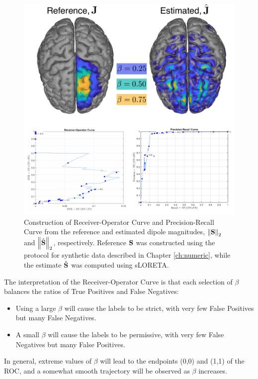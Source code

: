 \begin{figure}
\centering
\includegraphics[width=\linewidth]{./img_dev/AUROC_sketch.pdf}
%
\caption{Construction of Receiver-Operator Curve and Precision-Recall Curve from the reference and estimated dipole magnitudes, $\left\lVert {\mathbf{S}} \right\rVert_2$ and $\left\lVert \hat{\mathbf{S}} \right\rVert_2$, respectively.
%
Reference $\mathbf{S}$ was constructed using the protocol for synthetic data described in Chapter \ref{ch:numeric}, while the estimate $\hat{\mathbf{S}}$ was computed using sLORETA.
}
\end{figure}

The interpretation of the Receiver-Operator Curve is that each selection of $\beta$ balances the ratios of True Positives and False Negatives:
\begin{itemize}
\item 
Using a large $\beta$ will cause the labels to be strict, with very few False Positives but many False Negatives.
\item
A small $\beta$ will cause the labels to be permissive, with very few False Negatives but many False Positives.
\end{itemize}
In general, extreme values of $\beta$ will lead to the endpoints (0,0) and (1,1) of the ROC, and a somewhat smooth trajectory will be observed as $\beta$ increases.

